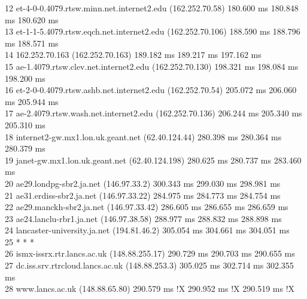 \documentclass[a4paper,11pt]{article}
\begin{document}
\begin{enumerate}[leftmargin=*]
\begin{enumerate}
{			12  et-4-0-0.4079.rtsw.minn.net.internet2.edu (162.252.70.58)  180.600 ms  180.848 ms  180.620 ms\\
			13  et-1-1-5.4079.rtsw.eqch.net.internet2.edu (162.252.70.106)  188.590 ms  188.796 ms  188.571 ms\\
			14  162.252.70.163 (162.252.70.163)  189.182 ms  189.217 ms  197.162 ms\\
			15  ae-1.4079.rtsw.clev.net.internet2.edu (162.252.70.130)  198.321 ms  198.084 ms  198.200 ms\\
			16  et-2-0-0.4079.rtsw.ashb.net.internet2.edu (162.252.70.54)  205.072 ms  206.060 ms  205.944 ms\\
			17  ae-2.4079.rtsw.wash.net.internet2.edu (162.252.70.136)  206.244 ms  205.340 ms  205.310 ms\\
			18  internet2-gw.mx1.lon.uk.geant.net (62.40.124.44)  280.398 ms  280.364 ms  280.379 ms\\
			19  janet-gw.mx1.lon.uk.geant.net (62.40.124.198)  280.625 ms  280.737 ms  283.460 ms\\
			20  ae29.londpg-sbr2.ja.net (146.97.33.2)  300.343 ms  299.030 ms  298.981 ms\\
			21  ae31.erdiss-sbr2.ja.net (146.97.33.22)  284.975 ms  284.773 ms  284.754 ms\\
			22  ae29.manckh-sbr2.ja.net (146.97.33.42)  286.605 ms  286.655 ms  286.659 ms\\
			23  ae24.lanclu-rbr1.ja.net (146.97.38.58)  288.977 ms  288.832 ms  288.898 ms\\
			24  lancaster-university.ja.net (194.81.46.2)  305.054 ms  304.661 ms  304.051 ms\\
			25  * * *\\
			26  ismx-issrx.rtr.lancs.ac.uk (148.88.255.17)  290.729 ms  290.703 ms  290.655 ms\\
			27  dc.iss.srv.rtrcloud.lancs.ac.uk (148.88.253.3)  305.025 ms  302.714 ms  302.355 ms\\
			28  www.lancs.ac.uk (148.88.65.80)  290.579 ms !X  290.952 ms !X  290.519 ms !X\\}
		\end{enumerate}


\end{enumerate}
\end{document}
